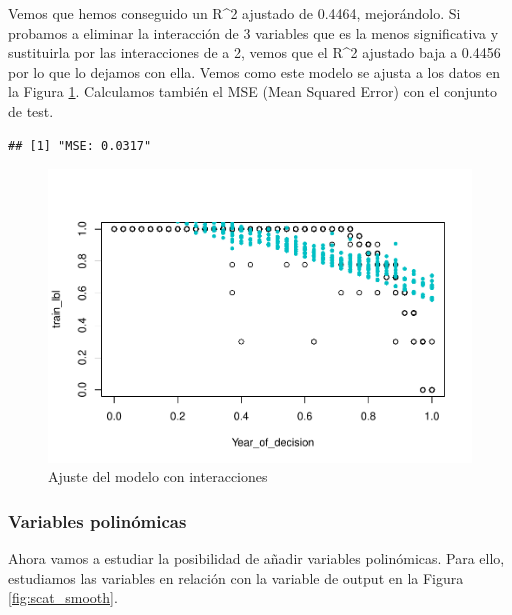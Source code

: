 \documentclass[
]{article}
\begin{document}
Vemos que hemos conseguido un R\^{}2 ajustado de 0.4464, mejorándolo. Si
probamos a eliminar la interacción de 3 variables que es la menos
significativa y sustituirla por las interacciones de a 2, vemos que el
R\^{}2 ajustado baja a 0.4456 por lo que lo dejamos con ella. Vemos como
este modelo se ajusta a los datos en la Figura \ref{fig:model_2}.
Calculamos también el MSE (Mean Squared Error) con el conjunto de test.

\begin{verbatim}
## [1] "MSE: 0.0317"
\end{verbatim}

\begin{figure}

{\centering \includegraphics[width=0.75\linewidth]{anacalt-regresion_files/figure-latex/model_2-1} 

}

\caption{Ajuste del modelo con interacciones}\label{fig:model_2}
\end{figure}

\hypertarget{variables-polinuxf3micas}{%
\subsubsection{Variables polinómicas}\label{variables-polinuxf3micas}}

Ahora vamos a estudiar la posibilidad de añadir variables polinómicas.
Para ello, estudiamos las variables en relación con la variable de
output en la Figura \ref{fig:scat_smooth}.
\end{document}
